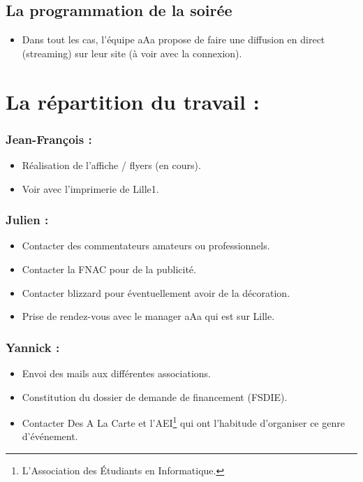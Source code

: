\subsection{La programmation de la soirée}
\begin{itemize}
\item Dans tout les cas, l'équipe aAa propose de faire une diffusion en direct (streaming) sur leur site (à voir avec la connexion).
\end{itemize}

\section{La répartition du travail :}

\subsubsection{Jean-François :}
\begin{itemize}
\item Réalisation de l'affiche / flyers (en cours).
\item Voir avec l'imprimerie de Lille1.
\end{itemize}

\subsubsection{Julien :}
\begin{itemize}
\item Contacter des commentateurs amateurs ou professionnels.
\item Contacter la FNAC pour de la publicité.
\item Contacter blizzard pour éventuellement avoir de la décoration.
\item Prise de rendez-vous avec le manager aAa qui est sur Lille.
\end{itemize}

\subsubsection{Yannick :}
\begin{itemize}
\item Envoi des mails aux différentes associations.
\item Constitution du dossier de demande de financement (FSDIE).
\item Contacter \og Des A La Carte \fg{} et l'AEI\footnote{L'Association des Étudiants en Informatique.} qui ont l'habitude d'organiser ce genre d’événement.
\end{itemize}
